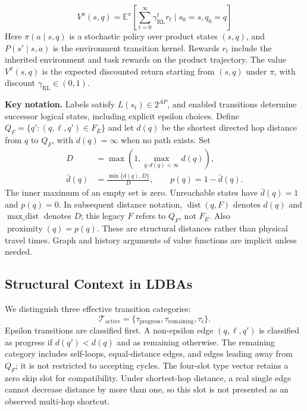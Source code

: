 \documentclass[journal]{IEEEtran}
\begin{document}
\begin{equation}
V^\pi(s,q) = \mathbb{E}^\pi\left[\sum_{t=0}^\infty \gamma_{\text{RL}}^t r_t \mid s_0 = s, q_0 = q\right]
\label{eq:value_func}
\end{equation}
Here $\pi(a\mid s,q)$ is a stochastic policy over product states $(s,q)$, and $P(s'\mid s,a)$ is the environment transition kernel. Rewards $r_t$ include the inherited environment and task rewards on the product trajectory. The value $V^\pi(s,q)$ is the expected discounted return starting from $(s,q)$ under $\pi$, with discount $\gamma_{\text{RL}} \in (0,1)$.

\textbf{Key notation.} Labels satisfy $L(s_t)\in2^{AP}$, and enabled transitions determine successor logical states, including explicit epsilon choices. Define $Q_F=\{q':(q,\ell,q')\in F_E\}$ and let $d(q)$ be the shortest directed hop distance from $q$ to $Q_F$, with $d(q)=\infty$ when no path exists. Set
\begin{equation*}
\begin{aligned}
D&=\max\!\left(1,\max_{q:d(q)<\infty}d(q)\right),\\
\bar d(q)&=\frac{\min\{d(q),D\}}{D},\qquad p(q)=1-\bar d(q).
\end{aligned}
\end{equation*}
The inner maximum of an empty set is zero. Unreachable states have $\bar d(q)=1$ and $p(q)=0$. In subsequent distance notation, $\operatorname{dist}(q,F)$ denotes $d(q)$ and $\operatorname{max\_dist}$ denotes $D$; this legacy $F$ refers to $Q_F$, not $F_E$. Also $\operatorname{proximity}(q)=p(q)$. These are structural distances rather than physical travel times. Graph and history arguments of value functions are implicit unless needed.

\subsection{Structural Context in LDBAs}
We distinguish three effective transition categories:
\begin{equation}
\mathcal T_{\mathrm{active}}=\{\tau_{\mathrm{progress}},\tau_{\mathrm{remaining}},\tau_\epsilon\}.
\label{eq:transition_types}
\end{equation}
Epsilon transitions are classified first. A non-epsilon edge $(q,\ell,q')$ is classified as progress if $d(q')<d(q)$ and as remaining otherwise. The remaining category includes self-loops, equal-distance edges, and edges leading away from $Q_F$; it is not restricted to accepting cycles. The four-slot type vector retains a zero skip slot for compatibility. Under shortest-hop distance, a real single edge cannot decrease distance by more than one, so this slot is not presented as an observed multi-hop shortcut.
\end{document}

